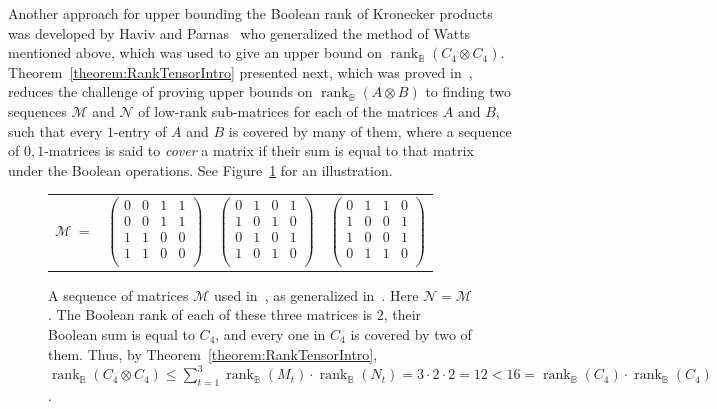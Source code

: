 \documentclass[11pt]{article}
\newcommand{\rank}{\mathop{\mathrm{rank}}}
\newcommand{\Rbool}{{\rank}_\mathbb{B}}
\begin{document}
{{Another approach for upper bounding the Boolean rank of Kronecker products was developed by Haviv and Parnas~\cite{haviv2022upper} who
generalized the method of Watts~\cite{watts2001boolean} mentioned above, which was used to give an upper bound on $\Rbool(C_4 \otimes C_4)$.
Theorem~\ref{theorem:RankTensorIntro} presented next, which was proved in~\cite{haviv2022upper}, reduces the challenge of proving upper bounds on  $\Rbool(A \otimes B)$ to
finding two sequences $\mathcal{M}$ and $\mathcal{N}$ of low-rank sub-matrices for each of the matrices $A$ and $B$,
such that every $1$-entry of $A$ and $B$ is covered by many of them,
where a sequence of $0,1$-matrices is said to {\em cover} a matrix if their sum is equal to that matrix under the Boolean operations.
See Figure~\ref{fig:Watts} for an illustration.


\begin{figure}[htb!]
\begin{center}
\begin{tabular}{ccc}
$ \mathcal{M} \; = \;\;$
$
\left(
  \begin{array}{cccc}
    0 & 0 & 1 & 1 \\
    0 & 0 & 1 & 1 \\
    1 & 1 & 0 & 0 \\
    1 & 1 & 0 & 0 \\
  \end{array}
\right)$
&
$
\left(
  \begin{array}{cccc}
    0 & 1 & 0 & 1 \\
    1 & 0 & 1 & 0 \\
    0 & 1 & 0 & 1 \\
    1 & 0 & 1 & 0 \\
  \end{array}
\right)
$
&
$
\left(
  \begin{array}{cccc}
    0 & 1 & 1 & 0 \\
    1 & 0 & 0 & 1 \\
    1 & 0 & 0 & 1 \\
    0 & 1 & 1 & 0 \\
  \end{array}
\right)$
\end{tabular}
\end{center}
\caption{A sequence of matrices $\mathcal{M}$ used in~\cite{watts2001boolean}, as generalized in~\cite{haviv2022upper}.
Here $\mathcal{N} = \mathcal{M}$. The Boolean rank of each of these three matrices is $2$,
their Boolean sum is equal to $C_4$, and every one in $C_4$ is covered by two of them.
Thus, by Theorem~\ref{theorem:RankTensorIntro}, $\Rbool(C_4 \otimes C_4) \leq \sum_{t=1}^{3} \Rbool(M_{t}) \cdot \Rbool(N_{t}) = 3\cdot 2 \cdot 2 = 12 < 16 = \Rbool(C_4)\cdot \Rbool(C_4)$. }
\label{fig:Watts}	
\end{figure}


}}
\end{document}
